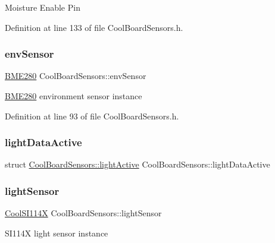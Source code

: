 Moisture Enable Pin 

Definition at line 133 of file Cool\+Board\+Sensors.\+h.

\mbox{\label{class_cool_board_sensors_a868e38985e9a2412829fa2790ca13e2e}} 
\subsubsection{\texorpdfstring{env\+Sensor}{envSensor}}
{\footnotesize\ttfamily \hyperlink{class_b_m_e280}{B\+M\+E280} Cool\+Board\+Sensors\+::env\+Sensor}

\hyperlink{class_b_m_e280}{B\+M\+E280} environment sensor instance 

Definition at line 93 of file Cool\+Board\+Sensors.\+h.

\mbox{\label{class_cool_board_sensors_ac4deb1cf41bac8b91c780c92fab00ba4}} 
\subsubsection{\texorpdfstring{light\+Data\+Active}{lightDataActive}}
{\footnotesize\ttfamily struct \hyperlink{struct_cool_board_sensors_1_1light_active}{Cool\+Board\+Sensors\+::light\+Active} Cool\+Board\+Sensors\+::light\+Data\+Active\hspace{0.3cm}{\ttfamily [private]}}

\mbox{\label{class_cool_board_sensors_ac711c27d0927eb5e73be77f092c48be0}} 
\subsubsection{\texorpdfstring{light\+Sensor}{lightSensor}}
{\footnotesize\ttfamily \hyperlink{class_cool_s_i114_x}{Cool\+S\+I114X} Cool\+Board\+Sensors\+::light\+Sensor}

S\+I114X light sensor instance 

